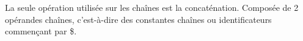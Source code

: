 La seule opération utilisée sur les chaînes est la concaténation.
Composée de 2 opérandes chaînes, c’est-à-dire des constantes chaînes ou identificateurs commençant par \$.